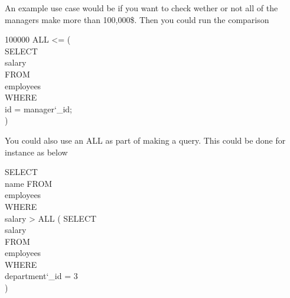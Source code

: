 \documentclass[10pt, english]{article}
\begin{document}
An example use case would be if you want to check wether or not all of the managers make more than 100,000\$. Then you could run 
the comparison

\begin{texttt} 100000 ALL <= ( \\
\hspace*{10pt} SELECT \\
\hspace*{10pt} \hspace*{10pt} salary \\
\hspace*{10pt} FROM \\
\hspace*{10pt} \hspace*{10pt} employees \\
\hspace*{10pt} WHERE \\
\hspace*{10pt} \hspace*{10pt} id = manager\char`_id;\\
)
\end{texttt}

You could also use an ALL as part of making a query. This could be done for instance as below

\begin{texttt} SELECT \\
\hspace*{10pt} name
FROM \\
\hspace*{10pt} employees \\
WHERE \\
\hspace*{10pt} salary > ALL (
\hspace*{10pt} \hspace*{10pt} SELECT \\
\hspace*{10pt} \hspace*{10pt} \hspace*{10pt} salary \\
\hspace*{10pt} \hspace*{10pt} FROM \\
\hspace*{10pt} \hspace*{10pt} \hspace*{10pt} employees \\
\hspace*{10pt} \hspace*{10pt} WHERE \\
\hspace*{10pt} \hspace*{10pt} \hspace*{10pt} department\char`_id = 3 \\
\hspace*{10pt} )
\end{texttt}
\end{document}
